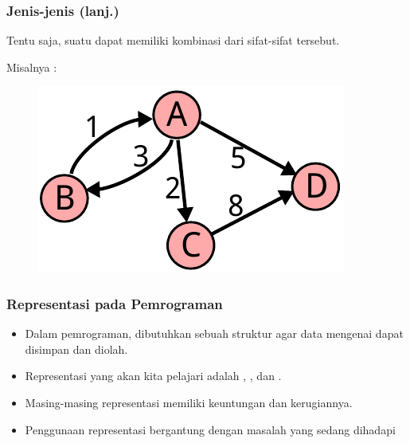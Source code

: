 \begin{frame}
\frametitle{Jenis-jenis \fGraph (lanj.)}
Tentu saja, suatu \fgraph dapat memiliki kombinasi dari sifat-sifat tersebut.

Misalnya :
\newline
\begin{figure}
  \centering
  \includegraphics[width=5 cm]{asset/weighted-directed.pdf}
\end{figure}
\end{frame}

\begin{frame}
\frametitle{Representasi \fGraph pada Pemrograman}

\begin{itemize}
  \item Dalam pemrograman, dibutuhkan sebuah struktur agar data mengenai \fgraph dapat disimpan dan diolah.
  \item Representasi yang akan kita pelajari adalah \fadjacencymatrix, \fadjacencylist, dan \fadjacencylist.
  \item Masing-masing representasi memiliki keuntungan dan kerugiannya.
  \item Penggunaan representasi \fgraph bergantung dengan masalah yang sedang dihadapi
\end{itemize}
\end{frame}


